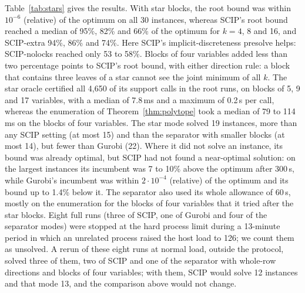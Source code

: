 Table~\ref{tab:stars} gives the results. With star blocks, the root bound was
within $10^{-6}$ (relative) of the optimum on all 30 instances, whereas SCIP's
root bound reached a median of 95\%, 82\% and 66\% of the optimum for $k=4$, 8
and 16, and SCIP-extra 94\%, 86\% and 74\%. Here SCIP's implicit-discreteness
presolve helps: SCIP-nolocks reached only 53 to 58\%. Blocks of four
variables added less than two percentage points to SCIP's root bound, with
either direction rule: a block that contains three leaves of a star cannot see
the joint minimum of all $k$. The star oracle certified all 4{,}650 of its
support calls in the root runs, on blocks of 5, 9 and 17 variables, with a
median of 7.8\,ms and a maximum of 0.2\,s per call, whereas the enumeration of
Theorem~\ref{thm:polytope} took a median of 79 to 114\,ms on the blocks of four
variables. The star mode solved 19 instances, more than any SCIP setting (at
most 15) and than the separator with smaller blocks (at most 14), but fewer
than Gurobi (22). Where it did not solve an instance, its bound was already
optimal, but SCIP had not found a near-optimal solution: on the largest
instances its incumbent was 7 to 10\% above the optimum after 300\,s, while
Gurobi's incumbent was within $2\cdot10^{-4}$ (relative) of the optimum and its
bound up to 1.4\% below it. The separator also used its whole allowance of
60\,s, mostly on the enumeration for the blocks of four variables that it tried
after the star blocks. Eight full runs
(three of SCIP, one of Gurobi and four of the separator modes) were stopped at
the hard process limit during a 13-minute period in which an unrelated process
raised the host load to 126; we count them as unsolved. A rerun of these eight
runs at normal load, outside the protocol, solved three of them, two of SCIP and
one of the separator with whole-row directions and blocks of four variables;
with them, SCIP would solve 12 instances and that mode 13, and the comparison
above would not change.
